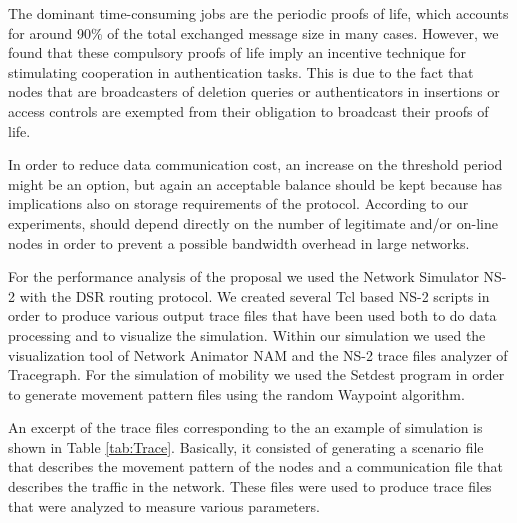 \documentclass{article}
\begin{document}
The dominant time-consuming jobs are the periodic proofs of life, which accounts for around 90\% of the
total exchanged message size in many cases. However, we found
that these compulsory proofs of life imply an incentive technique
for stimulating cooperation in authentication tasks. This is due
to the fact that nodes that are broadcasters of deletion queries or
authenticators in insertions or access controls  are exempted from
their obligation to broadcast their proofs of life.

In order to reduce  data communication cost, an
increase on the threshold period  might be an option, but again
an acceptable balance should be kept because  has implications also on storage requirements of the protocol. According to our
experiments,  should depend directly on the number of
legitimate and/or on-line nodes in order to prevent a possible
bandwidth overhead in large networks.

For the performance analysis of the proposal we used the Network
Simulator NS-2 with the DSR routing protocol.  We created several Tcl
based NS-2 scripts in order to produce various output trace files
that have been used both to do data processing and to visualize
the simulation. Within our simulation we  used the visualization
tool of Network Animator NAM  and the NS-2 trace files analyzer of
Tracegraph. For the simulation of mobility we used the Setdest
program in order to generate movement pattern files using the
random Waypoint algorithm.

An excerpt of the trace files corresponding to the
an example of simulation is shown in Table \ref{tab:Trace}.
Basically, it consisted of generating a scenario file that
describes the movement pattern of the nodes and a communication
file that describes the traffic in the network. These files were
used to produce trace files that were analyzed to measure various
parameters. 
\end{document}
